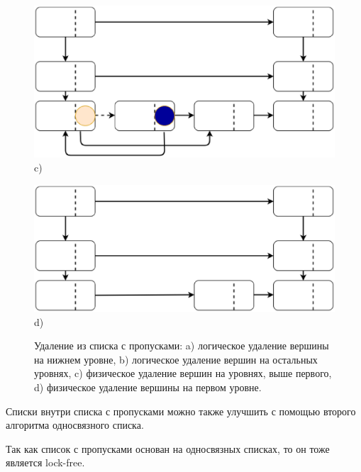 \documentclass[12pt]{report}
\begin{document}
{\begin{figure}[h!]
\begin{minipage}[h]{0.45\linewidth}
			\end{minipage}
			\vfill
			\begin{minipage}[h]{0.45\linewidth}
				\centering \includegraphics[width=1\linewidth]{17} c)\\
			\end{minipage}
			\hfill
			\begin{minipage}[h]{0.45\linewidth}
				\center \includegraphics[width=1\linewidth]{18} d) \\
			\end{minipage}
			\caption{Удаление из списка с пропусками: a) логическое удаление вершины на нижнем уровне, b) логическое удаление вершин на остальных уровнях, c) физическое удаление вершин на уровнях, выше первого, d) физическое удаление вершины на первом уровне.}
			\label{pic:skiplistDelete}
		\end{figure}
		\par Списки внутри списка с пропусками можно также улучшить с помощью второго алгоритма односвязного списка.
		\par Так как список с пропусками основан на односвязных списках, то он тоже является lock-free.
}
\end{document}
